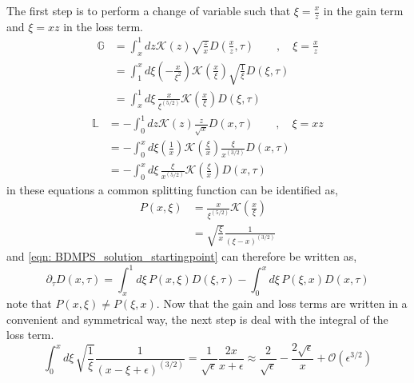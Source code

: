 \documentclass[main.tex]{subfiles}
\begin{document}
The first step is to perform a change of variable such that \(\xi = \frac{x}{z}\) in the gain term and \(\xi = xz\) in the loss term. 
\begin{align}\label{eqn: BDMPS_solution_gainterm_changeofvariable}
    \mathbb{G} &= \int_x^1 dz \mathcal{K}(z) \sqrt{\frac{z}{x}} D(\frac{x}{z}, \tau) \qquad,\quad \xi = \frac{x}{z} \nonumber \\
    &= \int_1^x d\xi (-\frac{x}{\xi^2}) \mathcal{K}(\frac{x}{\xi}) \sqrt{\frac{1}{\xi}} D(\xi, \tau) \nonumber \\
    &= \int_x^1 d\xi \,\frac{x}{\xi^(5/2)} \mathcal{K}(\frac{x}{\xi}) D(\xi, \tau)
\end{align}
\begin{align}\label{eqn: BDMPS_solution_lossterm_changeofvariable}
    \mathbb{L} &= - \int_0^1 dz \mathcal{K}(z) \frac{z}{\sqrt{x}} D(x,\tau)\qquad , \quad \xi = xz \nonumber \\
    &= - \int_0^x d\xi (\frac{1}{x}) \mathcal{K}(\frac{\xi}{x}) \frac{\xi}{x^(3/2)} D(x,\tau) \nonumber \\
    &= - \int_0^x d\xi \,\frac{\xi}{x^(5/2)} \mathcal{K}(\frac{\xi}{x}) D(x,\tau)
\end{align}
in these equations a common splitting function can be identified as, 
\begin{align}\label{eqn: BDMPS_solution_splittingfunction_xivariable}
    P(x,\xi) &= \frac{x}{\xi^(5/2)} \mathcal{K}(\frac{x}{\xi}) \nonumber \\
    &= \sqrt{\frac{\xi}{x}} \frac{1}{(\xi-x)^{(3/2)}}
\end{align}
and \autoref{eqn: BDMPS_solution_startingpoint} can therefore be written as, 
\begin{equation}\label{eqn: BDMPS_solution_evoleqn_with_xisplitfunc}
    \partial_\tau D(x,\tau) = \int_x^1 d\xi \,P(x,\xi) D(\xi, \tau) - \int_0^x d\xi \,P(\xi,x) D(x,\tau)
\end{equation}
note that \(P(x,\xi) \neq P(\xi, x)\). 
Now that the gain and loss terms are written in a convenient and symmetrical way, the next step is deal with the integral of the loss term.
\begin{equation}
    \int_0^x d\xi \, \sqrt{\frac{1}{\xi}} \frac{1}{(x-\xi+\epsilon)^{(3/2)}} = \frac{1}{\sqrt{\epsilon}} \frac{2x}{x+\epsilon} \approx \frac{2}{\sqrt \epsilon} - \frac{2\sqrt{\epsilon}}{x} + \mathcal{O}(\epsilon^{3/2}) 
\end{equation}
\end{document}
